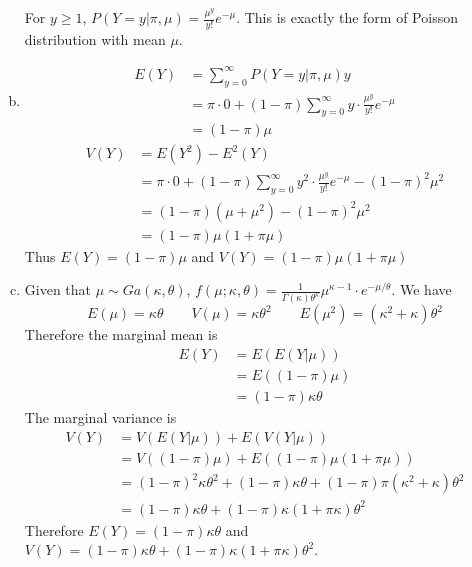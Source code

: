 \documentclass[12pt]{article}
\begin{document}
\begin{enumerate}[(a)]
	For $y\geq 1$, $P\left(\left.Y=y \right\vert \pi, \mu\right) = \frac{\mu^{y}}{y!}e^{-\mu}$. This is exactly the form of Poisson distribution with mean $\mu$.
	\item 
	\begin{align*}
		E(Y) &= \sum_{y=0}^{\infty}P\left(\left.Y=y \right\vert \pi, \mu\right) y\\
		&= \pi \cdot 0 + (1-\pi) \sum_{y=0}^{\infty}y\cdot \frac{\mu^{y}}{y!}e^{-\mu}\\
		&= (1-\pi)\mu
	\end{align*}
	\begin{align*}
	    V(Y) &= E(Y^2) - E^2(Y)\\
		&= \pi \cdot 0 + (1-\pi) \sum_{y=0}^{\infty}y^2 \cdot \frac{\mu^{y}}{y!}e^{-\mu} - (1-\pi)^2\mu^2\\
		&=(1-\pi)(\mu+\mu^2) - (1-\pi)^2\mu^2\\
		&= (1-\pi)\mu(1+\pi\mu)
	\end{align*}
	Thus $E(Y) = (1-\pi)\mu$ and $V(Y) = (1-\pi)\mu(1+\pi\mu)$
	\item Given that $\mu \sim Ga(\kappa, \theta)$, $f(\mu;\kappa, \theta)= \frac{1}{\Gamma(\kappa)\theta^{\kappa}}\mu^{\kappa-1}\cdot e^{-\mu/\theta}$. We have
	\[E(\mu)=\kappa\theta\qquad V(\mu)=\kappa\theta^2\qquad E(\mu^2) = (\kappa^2 + \kappa)\theta^2 \]
	Therefore the marginal mean is
	\begin{align*}
		E(Y) &= E\left(E\left(\left.Y\right\vert \mu\right)\right)\\
		&= E\left((1-\pi) \mu\right)\\
		&= (1-\pi)\kappa\theta
	\end{align*}
	The marginal variance is
	\begin{align*}
		V(Y) &= V\left(E\left(\left.Y\right\vert \mu\right)\right) + E\left(V\left(\left.Y\right\vert \mu\right)\right)\\
		&=V\left((1-\pi)\mu\right) + E\left((1-\pi)\mu(1+\pi\mu)\right)\\
		&=(1-\pi)^2 \kappa\theta^2 + (1-\pi)\kappa\theta + (1-\pi)\pi(\kappa^2+\kappa)\theta^2\\
		&= (1-\pi)\kappa\theta + (1-\pi)\kappa(1+\pi\kappa)\theta^2
	\end{align*}
	Therefore $E(Y)=(1-\pi)\kappa\theta$ and $V(Y)=(1-\pi)\kappa\theta + (1-\pi)\kappa(1+\pi\kappa)\theta^2$.
\end{enumerate}
\end{document}
